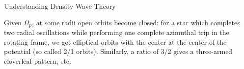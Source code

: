 \documentclass[letterpaper,landscape]{slides}
\begin{document}
\begin{slide}

\begin{center}
{\large \color{red} 
                 Understanding Density Wave Theory }
\end{center}

Given $\Omega_p$, at some radii open orbits become closed: for a
star which completes two radial oscillations while performing
one complete azimuthal trip in the rotating frame, we get
elliptical orbits with the center at the center of the potential
(so called 2/1 orbits). Similarly, a ratio of 3/2 gives a three-armed
cloverleaf pattern, etc.

\begin{center}
\vskip -0.45in
\end{center}

\vfill
\end{slide}
\end{document}
